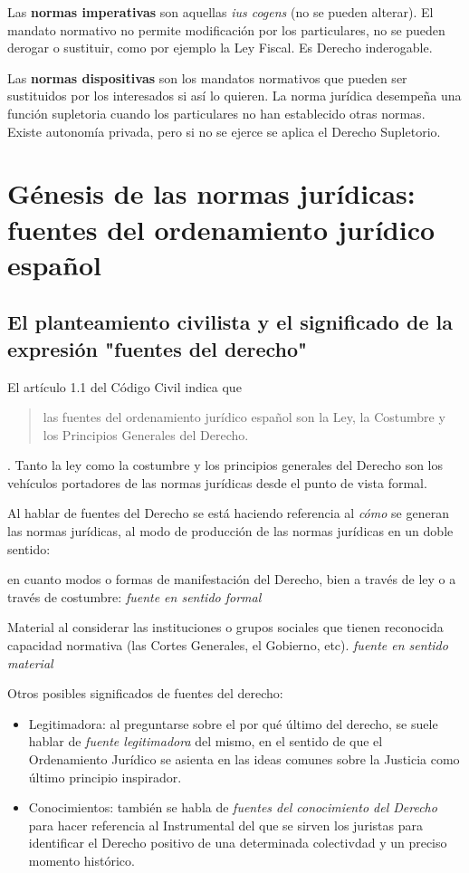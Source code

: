 \documentclass[a4paper,12pt]{report}
\begin{document}
Las \textbf{normas imperativas} son aquellas \emph{ius cogens} (no se pueden alterar). El
mandato normativo no permite modificación por los particulares, no se pueden
derogar o sustituir, como por ejemplo la Ley Fiscal. Es Derecho inderogable.

Las \textbf{normas dispositivas} son los mandatos normativos que pueden ser
sustituidos por los interesados si así lo quieren. La norma jurídica desempeña
una función supletoria cuando los particulares no han establecido otras normas.
Existe autonomía privada, pero si no se ejerce se aplica el Derecho Supletorio.

\section{Génesis de las normas jurídicas: fuentes del ordenamiento jurídico español}
\subsection{El planteamiento civilista y el significado de la expresión "fuentes del derecho"}
El artículo 1.1 del Código Civil indica que \begin{quote} las fuentes del
    ordenamiento jurídico español son la Ley, la Costumbre y los Principios
Generales del Derecho.\end{quote}. Tanto la ley como la costumbre y los
principios generales del Derecho son los vehículos portadores de las normas
jurídicas desde el punto de vista formal.

Al hablar de fuentes del Derecho se está haciendo referencia al \emph{cómo} se
generan las normas jurídicas, al modo de producción de las normas jurídicas en
un doble sentido:

\begin{description}
\item[Formal] en cuanto modos o formas de manifestación del Derecho, bien a
    través de ley o a través de costumbre: \emph{fuente en sentido formal}
\item{Material} al considerar las instituciones o grupos sociales que tienen
    reconocida capacidad normativa (las Cortes Generales, el Gobierno, etc).
    \emph{fuente en sentido material}
\end{description}

Otros posibles significados de fuentes del derecho:

\begin{itemize}
\item{Legitimadora: al preguntarse sobre el por qué último del derecho, se suele
    hablar de \textit{fuente legitimadora} del mismo, en el sentido de que el
Ordenamiento Jurídico se asienta en las ideas comunes sobre la Justicia como
último principio inspirador}.
\item{Conocimientos: también se habla de \textit{fuentes del conocimiento del Derecho} para hacer referencia al Instrumental del que se sirven los juristas para identificar el Derecho positivo de una determinada colectivdad y un preciso momento histórico.}
\end{itemize}
\end{document}
